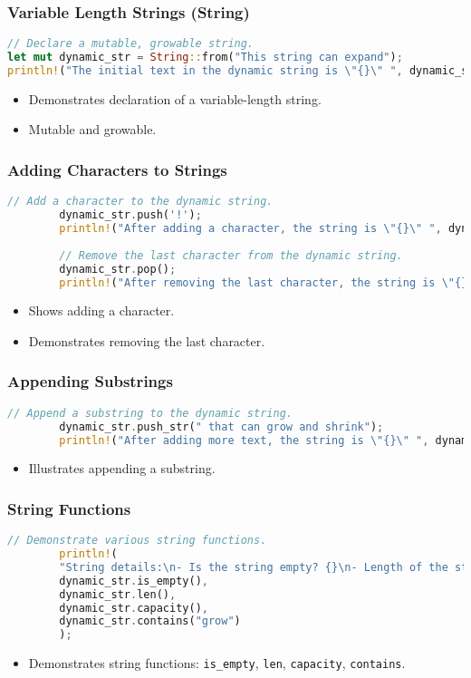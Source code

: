 \documentclass[aspectratio=169, table]{beamer}
\begin{document}
\begin{frame}[fragile]
\frametitle{Variable Length Strings (String)}
\begin{lstlisting}[language=Rust]
// Declare a mutable, growable string.
let mut dynamic_str = String::from("This string can expand");
println!("The initial text in the dynamic string is \"{}\" ", dynamic_str);
\end{lstlisting}
\begin{itemize}
\item Demonstrates declaration of a variable-length string.
\item Mutable and growable.
\end{itemize}
\end{frame}

\begin{frame}[fragile]
	\frametitle{Adding Characters to Strings}
	\begin{lstlisting}[language=Rust]
		// Add a character to the dynamic string.
		dynamic_str.push('!');
		println!("After adding a character, the string is \"{}\" ", dynamic_str);
		
		// Remove the last character from the dynamic string.
		dynamic_str.pop();
		println!("After removing the last character, the string is \"{}\" ", dynamic_str);
	\end{lstlisting}
	\begin{itemize}
		\item Shows adding a character.
		\item Demonstrates removing the last character.
	\end{itemize}
\end{frame}

\begin{frame}[fragile]
	\frametitle{Appending Substrings}
	\begin{lstlisting}[language=Rust]
		// Append a substring to the dynamic string.
		dynamic_str.push_str(" that can grow and shrink");
		println!("After adding more text, the string is \"{}\" ", dynamic_str);
	\end{lstlisting}
	\begin{itemize}
		\item Illustrates appending a substring.
	\end{itemize}
\end{frame}
		
\begin{frame}[fragile]
	\frametitle{String Functions}
	\begin{lstlisting}[language=Rust]
		// Demonstrate various string functions.
		println!(
		"String details:\n- Is the string empty? {}\n- Length of the string: {}\n- String capacity: {}\n- Does the string contain 'grow'? {}",
		dynamic_str.is_empty(),
		dynamic_str.len(),
		dynamic_str.capacity(),
		dynamic_str.contains("grow")
		);
	\end{lstlisting}
	\begin{itemize}
		\item Demonstrates string functions: \texttt{is\_empty}, \texttt{len}, \texttt{capacity}, \texttt{contains}.
	\end{itemize}
\end{frame}
\end{document}
